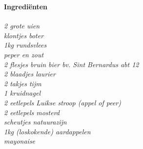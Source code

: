 \documentclass{article}
\newcommand{\sidebarsection}[1]{
    \large\textcolor{darkcol}{\textbf{#1}}
}
\newcommand{\ingredientitem}[1]{
    \vspace{3pt}
    \normalsize\emph{#1}
    \vspace{3pt}
}
\begin{document}
\begin{paracol}{2}
\begin{rightcolumn}
\sidebarsection{Ingrediënten} \\ \\
\ingredientitem{2 grote uien}\\ %
\ingredientitem{klontjes boter}\\
\ingredientitem{1kg rundsvlees}\\
\ingredientitem{peper en zout}\\
\ingredientitem{2 flesjes bruin bier bv. Sint Bernardus abt 12}\\
\ingredientitem{2 blaadjes laurier}\\
\ingredientitem{2 takjes tijm}\\
\ingredientitem{1 kruidnagel}\\
\ingredientitem{2 eetlepels Luikse stroop (appel of peer)}\\
\ingredientitem{2 eetlepels mosterd}\\
\ingredientitem{scheutjes natuurazijn}\\
\ingredientitem{1kg (loskokende) aardappelen}\\
\ingredientitem{mayonaise}\\

\end{rightcolumn}
\clearpage
\end{paracol}
\end{document}
